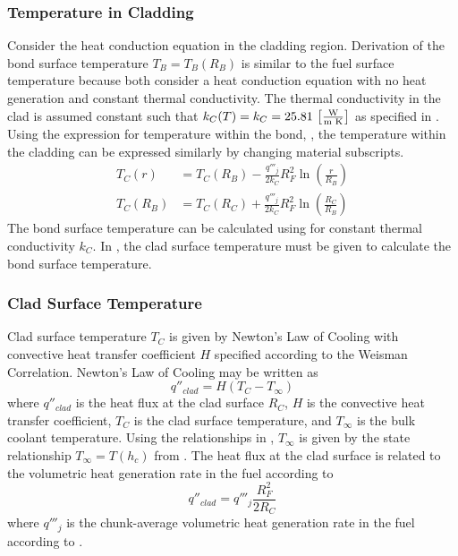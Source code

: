     \subsubsection{Temperature in Cladding}
      Consider the heat conduction equation in the cladding region. Derivation
      of the bond surface temperature $T_B=T_B(R_B)$ is similar to
      the fuel surface temperature because both consider a heat conduction
      equation with no heat generation and constant thermal conductivity.
      The
      thermal conductivity in the clad is assumed constant such that $k_C(T) =
      k_C = 25.81 \,\left[\text{{$\frac{\text{W}}{\text{m K}}$}}\right]$ as specified in
      .
      Using the expression for temperature within the bond,
      , the temperature within the cladding can be expressed
      similarly by changing material subscripts. 
      \begin{align}
        \label{eq:tcr}
        T_C(r) &= T_C(R_B) - \frac{q'''_j}{2 k_C} R_F^2
          \ln\left(\frac{r}{R_B}\right) \\
        \label{eq:tb_forward}
        T_C(R_B) &= T_C(R_C) + \frac{q'''_j}{2 k_C} R_F^2
          \ln\left(\frac{R_C}{R_B}\right)
      \end{align}
      The bond surface temperature can be calculated using 
      for constant thermal conductivity $k_C$. In , the clad
      surface temperature must be given to calculate the bond surface
      temperature.

    \subsubsection{Clad Surface Temperature}
      Clad surface temperature $T_C$ is given by Newton's Law of Cooling with
      convective heat transfer coefficient $H$ specified according to the
      Weisman Correlation. Newton's Law of Cooling may be written as
      \begin{equation}
        q''_{clad} = H (T_C - T_{\infty})
      \end{equation}
      where $q''_{clad}$ is the heat flux at the clad surface $R_C$, $H$ is
      the convective heat transfer coefficient, $T_C$ is the clad surface
      temperature, and $T_{\infty}$ is the bulk coolant temperature. Using the
      relationships in , $T_{\infty}$ is given
      by the state relationship $T_{\infty} = T(h_c)$ from \cite{sodiumProp}.
      The heat flux at the clad surface is related to the volumetric heat 
      generation rate in the fuel according to 
      \begin{equation}
        q''_{clad} = q'''_j \frac{R_F^2}{2 R_C}
      \end{equation}
      where $q'''_j$ is the chunk-average volumetric heat generation rate in the
      fuel according to .

